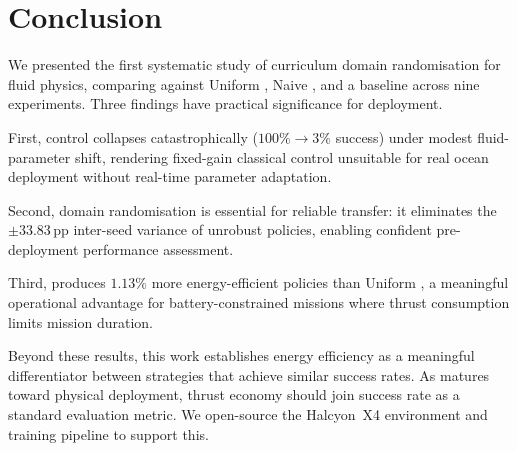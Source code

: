 
\section{Conclusion}
\label{sec:conclusion}

We presented the first systematic study of curriculum domain
randomisation for \AUV{} fluid physics, comparing \CDR{} against
Uniform \DR{}, Naive \SAC{}, and a \PID{} baseline across nine
experiments.
Three findings have practical significance for \AUV{} deployment.

First, \PID{} control collapses catastrophically
($100\% \to 3\%$ success) under modest fluid-parameter shift,
rendering fixed-gain classical control unsuitable for real ocean
deployment without real-time parameter adaptation.

Second, domain randomisation is essential for reliable transfer:
it eliminates the $\pm 33.83$\,pp inter-seed variance
of unrobust policies, enabling confident pre-deployment performance
assessment.

Third, \CDR{} produces $1.13\%$ more energy-efficient policies
than Uniform \DR{}, a meaningful operational advantage for
battery-constrained \AUV{} missions where thrust consumption limits
mission duration.

Beyond these results, this work establishes energy efficiency as a
meaningful differentiator between \DR{} strategies that achieve
similar success rates.
As \AUV{} \RL{} matures toward physical deployment, thrust economy
should join success rate as a standard evaluation metric.
We open-source the Halcyon~X4 environment and training pipeline to
support this.
